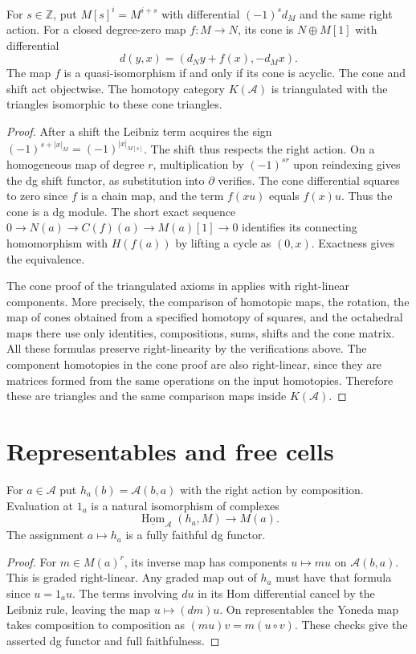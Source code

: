 \begin{proposition}\label{res:G04}
For \(s\in\mathbb Z\), put \(M[s]^i=M^{i+s}\) with differential
\((-1)^s d_M\) and the same right action. For a closed degree-zero
map \(f:M\to N\), its cone is \(N\oplus M[1]\) with differential
\[
 d(y,x)=(d_N y+f(x),-d_M x).
\]
The map \(f\) is a quasi-isomorphism if and only if its cone is
acyclic. The cone and shift act objectwise. The homotopy category
\(K(\mathcal A)\) is triangulated with the triangles isomorphic to
these cone triangles.
\end{proposition}
\begin{proof}
After a shift the Leibniz term acquires the sign
\((-1)^{s+|x|_M}=(-1)^{|x|_{M[s]}}\). The shift thus respects the
right action. On a homogeneous map of degree \(r\), multiplication
by \((-1)^{sr}\) upon reindexing gives the dg shift functor, as
substitution into \(\partial\) verifies. The cone differential
squares to zero since \(f\) is a chain map, and the term \(f(xu)\)
equals \(f(x)u\). Thus the cone is a dg module. The short exact
sequence \(0\to N(a)\to C(f)(a)\to M(a)[1]\to 0\) identifies
its connecting homomorphism with \(H(f(a))\) by lifting a cycle
as \((0,x)\). Exactness gives the equivalence.

The cone proof of the triangulated axioms in
\cite[K01--K06]{ha-core} applies with right-linear components.
More precisely, the comparison of homotopic maps, the rotation,
the map of cones obtained from a specified homotopy of squares,
and the octahedral maps there use only identities, compositions,
sums, shifts and the cone matrix. All these formulas preserve
right-linearity by the verifications above. The component
homotopies in the cone proof are also right-linear, since they
are matrices formed from the same operations on the input
homotopies. Therefore these are triangles and the same comparison
maps inside \(K(\mathcal A)\).
\end{proof}

\section{Representables and free cells}

\begin{lemma}\label{res:G05}
For \(a\in\mathcal A\) put \(h_a(b)=\mathcal A(b,a)\) with the
right action by composition. Evaluation at \(1_a\) is a natural
isomorphism of complexes
\[
     \underline{\operatorname{Hom}}_{\mathcal A}(h_a,M)
        \longrightarrow M(a).
\]
The assignment \(a\mapsto h_a\) is a fully faithful dg functor.
\end{lemma}
\begin{proof}
For \(m\in M(a)^r\), its inverse map has components
\(u\mapsto m u\) on \(\mathcal A(b,a)\). This is graded right-linear.
Any graded map out of \(h_a\) must have that formula since
\(u=1_a u\). The terms involving \(d u\) in its Hom differential
cancel by the Leibniz rule, leaving the map \(u\mapsto (d m)u\).
On representables the Yoneda map takes composition to composition
as \((m u)v=m(u\circ v)\). These checks give the asserted dg
functor and full faithfulness.
\end{proof}

